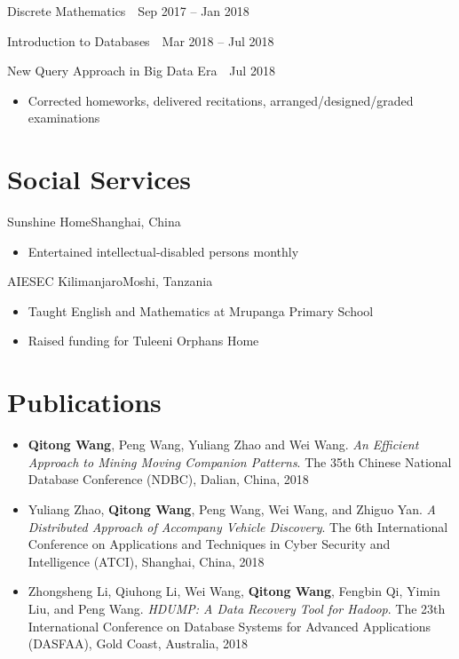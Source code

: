 \documentclass{resume}
\begin{document}
\hspace{\parindent} Discrete Mathematics\ \ \hfill Sep 2017 -- Jan 2018\ \

\hspace{\parindent} Introduction to Databases\ \ \hfill Mar 2018 -- Jul 2018\ \

\hspace{\parindent} New Query Approach in Big Data Era\ \ \hfill Jul 2018\ \

\begin{itemize}
  \item Corrected homeworks, delivered recitations, arranged/designed/graded examinations
\end{itemize}


% 
% 

\section{Social Services}

{Sunshine Home}{Shanghai, China}
\begin{itemize}
  \item Entertained intellectual-disabled persons monthly
\end{itemize}

{AIESEC Kilimanjaro}{Moshi, Tanzania}
\begin{itemize}
  \item Taught English and Mathematics at Mrupanga Primary School
  \item Raised funding for Tuleeni Orphans Home
\end{itemize}

% 
% 

\section{Publications}
\begin{itemize}[parsep=0.5ex]
  \item \textbf{Qitong Wang}, Peng Wang, Yuliang Zhao and Wei Wang. 
  \textit{An Efficient Approach to Mining Moving Companion Patterns}. 
  The 35th Chinese National Database Conference (NDBC), Dalian, China, 2018
  \item Yuliang Zhao, \textbf{Qitong Wang}, Peng Wang, Wei Wang, and Zhiguo Yan. 
  \textit{A Distributed Approach of Accompany Vehicle Discovery}. 
  The 6th International Conference on Applications and Techniques in Cyber Security and Intelligence (ATCI), Shanghai, China, 2018
  \item Zhongsheng Li, Qiuhong Li, Wei Wang, \textbf{Qitong Wang}, Fengbin Qi, Yimin Liu, and Peng Wang. 
  \textit{HDUMP: A Data Recovery Tool for Hadoop}. 
  The 23th International Conference on Database Systems for Advanced Applications (DASFAA), Gold Coast, Australia, 2018
\end{itemize}
\end{document}
